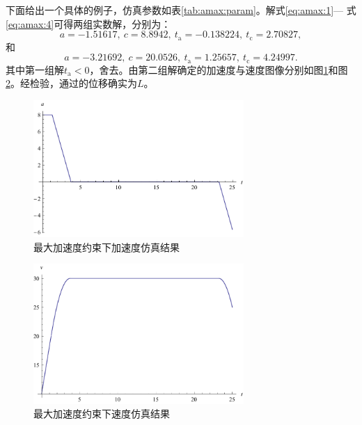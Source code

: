 下面给出一个具体的例子，仿真参数如表\ref{tab:amax:param}。解式\eqref{eq:amax:1}--- 式\eqref{eq:amax:4}可得两组实数解，分别为：
\[a = -1.51617,\ c = 8.8942,\ t_\mathrm{a} = -0.138224,\ t_\mathrm{c} = 2.70827,\]
和
\[a = -3.21692,\ c = 20.0526,\ t_\mathrm{a} = 1.25657,\ t_\mathrm{c} = 4.24997.\]
其中第一组解$t_\mathrm{a}<0$，舍去。由第二组解确定的加速度与速度图像分别如图\ref{fig:amax:a}和图\ref{fig:amax:v}。经检验，通过的位移确实为$L$。

\begin{figure}[htbp]
\centering
\includegraphics[width=8cm]{figures/uopt/a.pdf}
\caption{最大加速度约束下加速度仿真结果}
\label{fig:amax:a}
\end{figure}
\begin{figure}[htbp]
\centering
\includegraphics[width=8cm]{figures/uopt/v.pdf}
\caption{最大加速度约束下速度仿真结果}
\label{fig:amax:v}
\end{figure}

